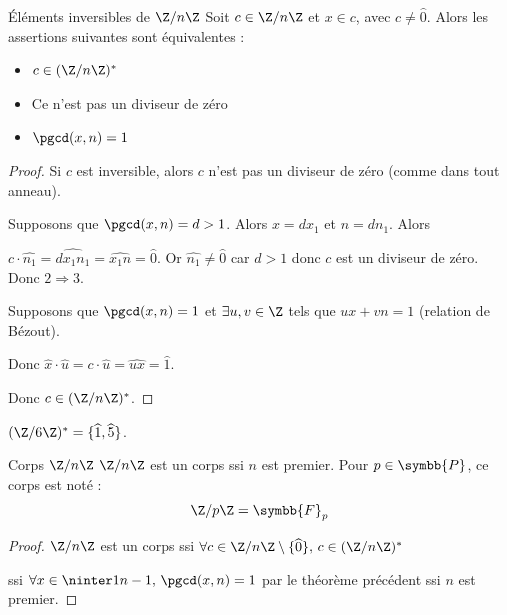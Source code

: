 \begin{theoreme}{Éléments inversibles de $\Z / n \Z$}{}
    Soit $c \in \Z/n \Z$ et $x \in c$, avec $c \neq \hat 0$. 
    Alors les assertions suivantes sont équivalentes : 
    
    \begin{itemize}
        \item $c \in (\Z / n \Z)^*$
        \item Ce n'est pas un diviseur de zéro
        \item $\pgcd(x, n) = 1$ 
    \end{itemize}
\end{theoreme}


\begin{proof}
    Si $c$ est inversible, alors $c$ n'est pas un diviseur de zéro (comme dans tout anneau).

    Supposons que $\pgcd(x, n) = d > 1$. Alors $x = d x_1$ et $n = d n_1$. Alors 

    $c \cdot \widehat{n_1} = \widehat{dx_1n_1} = \widehat{x_1n} = \widehat{0}$. 
    Or $\widehat {n_1} \neq \widehat{0}$ car $d > 1$ donc $c$ est un diviseur de zéro.
    Donc $2 \Rightarrow 3$.

    \avspace Supposons que $\pgcd(x, n) = 1$ et $\exists u, v \in \Z$ tels que $ux + vn = 1$ (relation de Bézout).

    Donc $\widehat x \cdot \widehat u = c \cdot \widehat u = \widehat{ux} = \widehat{1}$.

    Donc $c \in (\Z/n\Z)^*$.
\end{proof}

\begin{exemple}
    $(\Z/6\Z)^* = \{\widehat{1}, \widehat{5}\}$.
\end{exemple}

\begin{theoreme}{Corps $\Z/n\Z$}{}
    $\Z/n\Z$ est un corps ssi $n$ est premier. Pour $p \in \symbb{P}$, ce corps est noté :
    \[\Z/p\Z = \symbb{F}_p\]
\end{theoreme}

\begin{proof}
    $\Z/n \Z$ est un corps ssi $\forall c \in \Z / n \Z \setminus \{\widehat{0}\}, \, c \in (\Z / n \Z)^*$

    ssi $\forall x \in \ninter 1 {n - 1}, \, \pgcd(x, n) = 1$ par le théorème précédent
    ssi $n$ est premier.
\end{proof}

